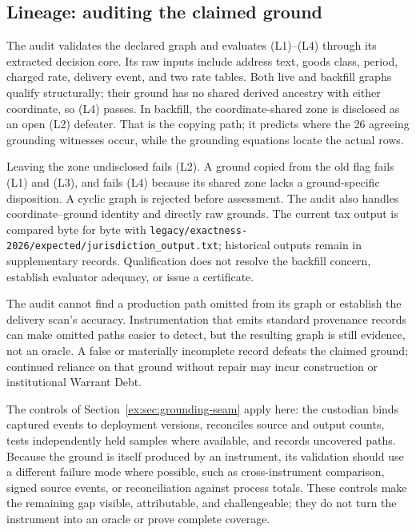 \documentclass[twocolumn,envcountsect,envcountsame,natbib]{svjour3}
\begin{document}
\subsection{Lineage: auditing the claimed ground}\label{ex:sec:case-audit}

The audit validates the declared graph and evaluates (L1)--(L4) through its extracted decision core. Its raw inputs include address text, goods class, period, charged rate, delivery event, and two rate tables. Both live and backfill graphs qualify structurally; their ground has no shared derived ancestry with either coordinate, so (L4) passes. In backfill, the coordinate-shared zone is disclosed as an open (L2) defeater. That is the copying path; it predicts where the 26 agreeing grounding witnesses occur, while the grounding equations locate the actual rows.

Leaving the zone undisclosed fails (L2). A ground copied from the old flag fails (L1) and (L3), and fails (L4) because its shared zone lacks a ground-specific disposition. A cyclic graph is rejected before assessment. The audit also handles coordinate--ground identity and directly raw grounds. The current tax output is compared byte for byte with \nolinkurl{legacy/exactness-2026/expected/jurisdiction_output.txt}; historical outputs remain in supplementary records. Qualification does not resolve the backfill concern, establish evaluator adequacy, or issue a certificate.

The audit cannot find a production path omitted from its graph or establish the delivery scan's accuracy. Instrumentation that emits standard provenance records can make omitted paths easier to detect, but the resulting graph is still evidence, not an oracle. A false or materially incomplete record defeats the claimed ground; continued reliance on that ground without repair may incur construction or institutional Warrant Debt.

The controls of Section~\ref{ex:sec:grounding-seam} apply here: the custodian binds captured events to deployment versions, reconciles source and output counts, tests independently held samples where available, and records uncovered paths. Because the ground is itself produced by an instrument, its validation should use a different failure mode where possible, such as cross-instrument comparison, signed source events, or reconciliation against process totals. These controls make the remaining gap visible, attributable, and challengeable; they do not turn the instrument into an oracle or prove complete coverage.
\end{document}

